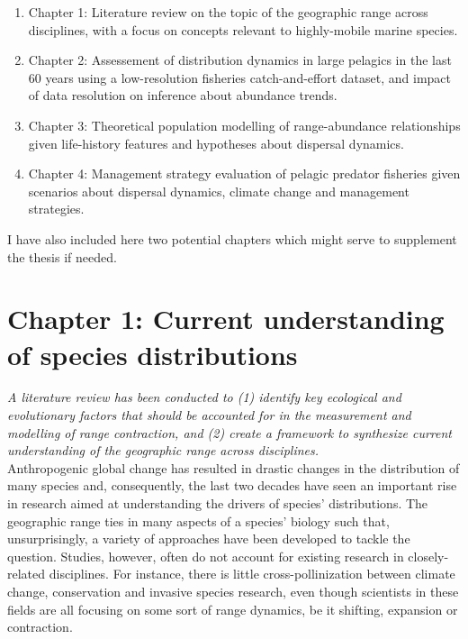 \documentclass{article}
\begin{document}
\begin{enumerate}[{\tiny $\bullet$}]
\item Chapter 1: Literature review on the topic of the geographic range
across disciplines, with a focus on concepts relevant to highly-mobile
marine species.
\item Chapter 2: Assessement of distribution dynamics in large
  pelagics in the last 60 years using a
low-resolution fisheries catch-and-effort dataset, and impact of data
resolution on inference about abundance trends.
\item Chapter 3: Theoretical population modelling of range-abundance
relationships given life-history features and hypotheses about
dispersal dynamics.
\item Chapter 4: Management strategy evaluation of pelagic predator
fisheries given scenarios about dispersal dynamics, climate change and
management strategies.
\end{enumerate}

I have also included here two potential chapters which
might serve to supplement the thesis if needed.\\


\newpage
\section*{Chapter 1: Current understanding of species distributions}
\addtocounter{section}{1}

\emph{A literature review has been conducted to (1) identify key
  ecological and evolutionary factors that should be accounted for
  in the measurement and modelling of range contraction, and (2)
  create a framework to synthesize current understanding of the
  geographic range across disciplines.}
\\

Anthropogenic global change has resulted in drastic changes in the
distribution of many species and, consequently, the last
two decades have seen an important rise in research aimed at understanding
the drivers of species' distributions. The geographic
range ties in many aspects of a species' biology such that,
unsurprisingly, a variety of approaches have been developed to tackle
the question. Studies, however, often do not account for existing research in
closely-related disciplines. For instance, there is little
cross-pollinization between climate change, conservation and invasive
species research, even though scientists in these fields are all
focusing on some sort of range dynamics, be it shifting, expansion or
contraction.
\end{document}
